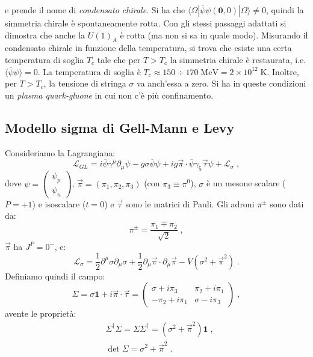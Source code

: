 \documentclass[12pt,a4paper]{article}
\theoremstyle{definition}
\newcommand{\lag}{\mathcal{L}}
\newcommand{\bra}{\langle}
\newcommand{\ket}{\rangle}
\newcommand{\adj}[1]{#1^{\dagger}}
\numberwithin{equation}{section}
\begin{document}
e prende il nome di \emph{condensato chirale}. Si ha che $\bra\Omega|\overline{\psi}\psi(\mathbf{0},0)|\Omega\ket\ne 0$, quindi la simmetria chirale è spontaneamente rotta. Con gli stessi passaggi adattati si dimostra che anche la $U(1)_A$ è rotta (ma non si sa in quale modo). Misurando il condensato chirale in funzione della temperatura, si trova che esiste una certa temperatura di soglia $T_c$ tale che per $T>T_c$ la simmetria chirale è restaurata, i.e. $\bra\overline{\psi}\psi\ket=0$. La temperatura di soglia è $T_c\approx 150\div 170\;\mathrm{MeV}=2\times 10^{12}\;\mathrm{K}$. Inoltre, per $T>T_c$, la tensione di stringa $\sigma$ va anch'essa a zero. Si ha in queste condizioni un \emph{plasma quark-gluone} in cui non c'è più confinamento.
\subsection{Modello sigma di Gell-Mann e Levy}
Consideriamo la Lagrangiana:
\begin{equation}
\lag_{GL}=i\overline{\psi}\gamma^{\mu}\partial_{\mu}\psi-g\sigma\overline{\psi}\psi+ig\vec{\pi}\cdot\overline{\psi}\gamma_5\vec{\tau}\psi+\lag_{\sigma}\;,
\end{equation}
dove $\psi=\left(\begin{matrix}
\psi_p \\
\psi_n
\end{matrix}\right)$, $\vec{\pi}=(\pi_1,\pi_2,\pi_3)$ (con $\pi_3\equiv\pi^0$), $\sigma$ è un mesone scalare ($P=+1$) e isoscalare ($t=0$) e $\vec{\tau}$ sono le matrici di Pauli. Gli adroni $\pi^{\pm}$ sono dati da:
$$
\pi^{\pm}=\frac{\pi_1\mp\pi_2}{\sqrt{2}}\;,
$$
$\vec{\pi}$ ha $J^P=0^-$, e:
\begin{equation}
\lag_{\sigma}=\frac{1}{2}\partial^{\mu}\sigma\partial_{\mu}\sigma+\frac{1}{2}\partial_{\mu}\vec{\pi}\cdot\partial_{\mu}\vec{\pi}-V(\sigma^2+\vec{\pi}^2)\;.
\end{equation}
Definiamo quindi il campo:
\begin{equation}
\Sigma=\sigma\mathbf{1}+i\vec{\pi}\cdot\vec{\tau}=\left(\begin{matrix}
\sigma+i\pi_3 & \pi_2+i\pi_1 \\
-\pi_2+i\pi_1 & \sigma-i\pi_3
\end{matrix}\right)\;,
\end{equation}
avente le proprietà:
\begin{align}
&\adj{\Sigma}\Sigma=\Sigma\adj{\Sigma}=(\sigma^2+\vec{\pi}^2)\mathbf{1}\;, \\
&\det\Sigma=\sigma^2+\vec{\pi}^2\;.
\end{align}
\end{document}
